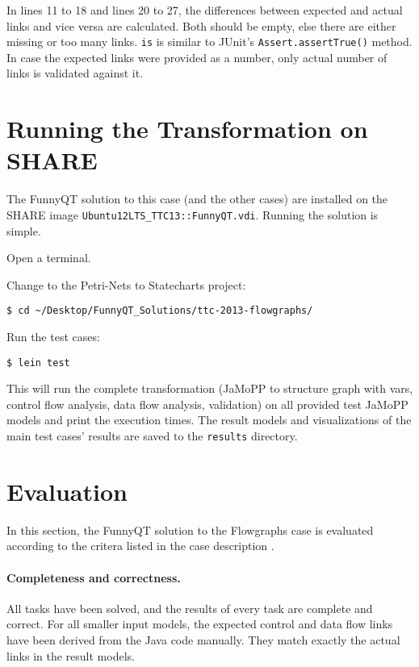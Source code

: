 \documentclass[11pt]{article}
\begin{document}
In lines 11 to 18 and lines 20 to 27, the differences between expected and
actual links and vice versa are calculated.  Both should be empty, else there
are either missing or too many links.  \verb|is| is similar to JUnit's
\verb|Assert.assertTrue()| method.  In case the expected links were provided as
a number, only actual number of links is validated against it.


\section{Running the Transformation on SHARE}
\label{sec:run-transformation}

The FunnyQT solution to this case (and the other cases) are installed on the
SHARE image \verb|Ubuntu12LTS_TTC13::FunnyQT.vdi|.  Running the solution is
simple.

\begin{compactenum}
\item Open a terminal.
\item Change to the Petri-Nets to Statecharts project:

  \verb|$ cd ~/Desktop/FunnyQT_Solutions/ttc-2013-flowgraphs/|
\item Run the test cases:

  \verb|$ lein test|
\end{compactenum}

This will run the complete transformation (JaMoPP to structure graph with vars,
control flow analysis, data flow analysis, validation) on all provided test
JaMoPP models and print the execution times.  The result models and
visualizations of the main test cases' results are saved to the \verb|results|
directory.


\section{Evaluation}
\label{sec:evaluation}


In this section, the FunnyQT solution to the Flowgraphs case is evaluated
according to the critera listed in the case description
\cite{flowgraphcasedesc}.

\paragraph{Completeness and correctness.}

All tasks have been solved, and the results of every task are complete and
correct.  For all smaller input models, the expected control and data flow
links have been derived from the Java code manually.  They match exactly the
actual links in the result models.
\end{document}
